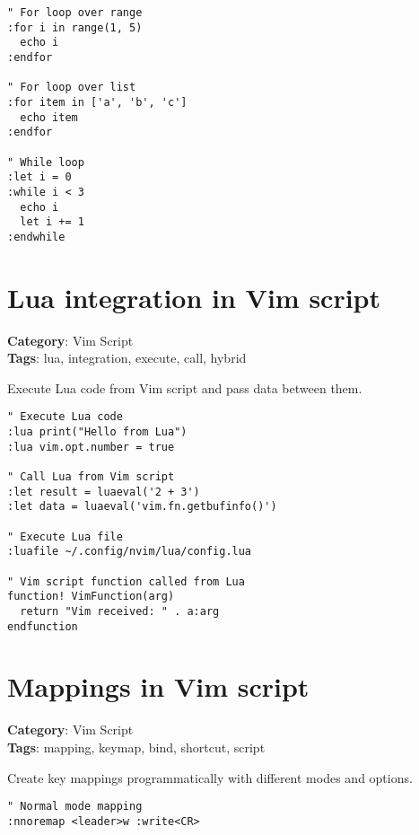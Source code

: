 {{{{{{{{{{{{{{{{{{\begin{Exa*}{}
\begin{Verbatim}[fontsize=\footnotesize, breaklines, breakanywhere]
" For loop over range
:for i in range(1, 5)
  echo i
:endfor

" For loop over list
:for item in ['a', 'b', 'c']
  echo item
:endfor

" While loop
:let i = 0
:while i < 3
  echo i
  let i += 1
:endwhile
\end{Verbatim}
\end{Exa*}

\section{Lua integration in Vim script}

\textbf{Category}: Vim Script\\ \textbf{Tags}: lua, integration, execute, call, hybrid
\vspace{0.5cm}

Execute Lua code from Vim script and pass data between them.

\begin{Exa*}{}
\begin{Verbatim}[fontsize=\footnotesize, breaklines, breakanywhere]
" Execute Lua code
:lua print("Hello from Lua")
:lua vim.opt.number = true

" Call Lua from Vim script
:let result = luaeval('2 + 3')
:let data = luaeval('vim.fn.getbufinfo()')

" Execute Lua file
:luafile ~/.config/nvim/lua/config.lua

" Vim script function called from Lua
function! VimFunction(arg)
  return "Vim received: " . a:arg
endfunction
\end{Verbatim}
\end{Exa*}

\section{Mappings in Vim script}

\textbf{Category}: Vim Script\\ \textbf{Tags}: mapping, keymap, bind, shortcut, script
\vspace{0.5cm}

Create key mappings programmatically with different modes and options.

\begin{Exa*}{}
\begin{Verbatim}[fontsize=\footnotesize, breaklines, breakanywhere]
" Normal mode mapping
:nnoremap <leader>w :write<CR>


\end{Verbatim}
\end{Exa*}}}}}}}}}}}}}}}}}}}
